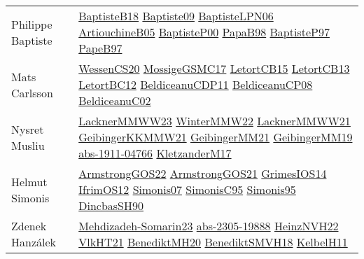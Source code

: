 {\begin{longtable}{p{4cm}p{20cm}}
Philippe Baptiste & \href{articles/BaptisteB18.pdf}{BaptisteB18}\cite{BaptisteB18} \href{papers/Baptiste09.pdf}{Baptiste09}\cite{Baptiste09} \href{}{BaptisteLPN06}\cite{BaptisteLPN06} \href{papers/ArtiouchineB05.pdf}{ArtiouchineB05}\cite{ArtiouchineB05} \href{articles/BaptisteP00.pdf}{BaptisteP00}\cite{BaptisteP00} \href{articles/PapaB98.pdf}{PapaB98}\cite{PapaB98} \href{papers/BaptisteP97.pdf}{BaptisteP97}\cite{BaptisteP97} \href{}{PapeB97}\cite{PapeB97} \\
Mats Carlsson & \href{papers/WessenCS20.pdf}{WessenCS20}\cite{WessenCS20} \href{papers/MossigeGSMC17.pdf}{MossigeGSMC17}\cite{MossigeGSMC17} \href{articles/LetortCB15.pdf}{LetortCB15}\cite{LetortCB15} \href{papers/LetortCB13.pdf}{LetortCB13}\cite{LetortCB13} \href{papers/LetortBC12.pdf}{LetortBC12}\cite{LetortBC12} \href{articles/BeldiceanuCDP11.pdf}{BeldiceanuCDP11}\cite{BeldiceanuCDP11} \href{papers/BeldiceanuCP08.pdf}{BeldiceanuCP08}\cite{BeldiceanuCP08} \href{papers/BeldiceanuC02.pdf}{BeldiceanuC02}\cite{BeldiceanuC02} \\
Nysret Musliu & \href{articles/LacknerMMWW23.pdf}{LacknerMMWW23}\cite{LacknerMMWW23} \href{papers/WinterMMW22.pdf}{WinterMMW22}\cite{WinterMMW22} \href{papers/LacknerMMWW21.pdf}{LacknerMMWW21}\cite{LacknerMMWW21} \href{papers/GeibingerKKMMW21.pdf}{GeibingerKKMMW21}\cite{GeibingerKKMMW21} \href{papers/GeibingerMM21.pdf}{GeibingerMM21}\cite{GeibingerMM21} \href{papers/GeibingerMM19.pdf}{GeibingerMM19}\cite{GeibingerMM19} \href{articles/abs-1911-04766.pdf}{abs-1911-04766}\cite{abs-1911-04766} \href{papers/KletzanderM17.pdf}{KletzanderM17}\cite{KletzanderM17} \\
Helmut Simonis & \href{papers/ArmstrongGOS22.pdf}{ArmstrongGOS22}\cite{ArmstrongGOS22} \href{papers/ArmstrongGOS21.pdf}{ArmstrongGOS21}\cite{ArmstrongGOS21} \href{articles/GrimesIOS14.pdf}{GrimesIOS14}\cite{GrimesIOS14} \href{papers/IfrimOS12.pdf}{IfrimOS12}\cite{IfrimOS12} \href{articles/Simonis07.pdf}{Simonis07}\cite{Simonis07} \href{papers/SimonisC95.pdf}{SimonisC95}\cite{SimonisC95} \href{papers/Simonis95.pdf}{Simonis95}\cite{Simonis95} \href{articles/DincbasSH90.pdf}{DincbasSH90}\cite{DincbasSH90} \\
Zdenek Hanz{\'{a}}lek & \href{papers/Mehdizadeh-Somarin23.pdf}{Mehdizadeh-Somarin23}\cite{Mehdizadeh-Somarin23} \href{articles/abs-2305-19888.pdf}{abs-2305-19888}\cite{abs-2305-19888} \href{articles/HeinzNVH22.pdf}{HeinzNVH22}\cite{HeinzNVH22} \href{articles/VlkHT21.pdf}{VlkHT21}\cite{VlkHT21} \href{articles/BenediktMH20.pdf}{BenediktMH20}\cite{BenediktMH20} \href{papers/BenediktSMVH18.pdf}{BenediktSMVH18}\cite{BenediktSMVH18} \href{articles/KelbelH11.pdf}{KelbelH11}\cite{KelbelH11} \\

\end{longtable}}
